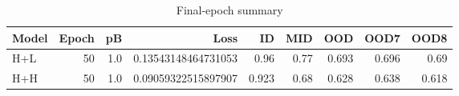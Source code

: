 \begin{table}[t]
\centering
\begin{tabular}{lrrrrrrrr}
\hline
Model & Epoch & pB & Loss & ID & MID & OOD & OOD7 & OOD8 \\
\hline
H+L & 50 & 1.0 & 0.13543148464731053 & 0.96 & 0.77 & 0.693 & 0.696 & 0.69 \\
H+H & 50 & 1.0 & 0.09059322515897907 & 0.923 & 0.68 & 0.628 & 0.638 & 0.618 \\
\hline
\end{tabular}
\caption{Final-epoch summary}
\label{tab:final}
\end{table}
